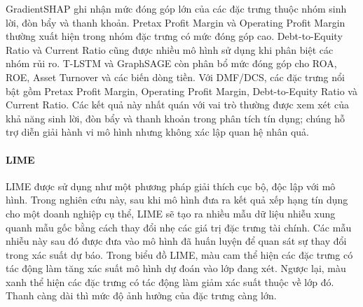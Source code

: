 \documentclass[10pt,twoside]{article}
\begin{document}
GradientSHAP ghi nhận mức đóng góp lớn của các đặc trưng thuộc nhóm sinh lời, đòn bẩy và thanh khoản. Pretax Profit Margin và Operating Profit Margin thường xuất hiện trong nhóm đặc trưng có mức đóng góp cao. Debt-to-Equity Ratio và Current Ratio cũng được nhiều mô hình sử dụng khi phân biệt các nhóm rủi ro. T-LSTM và GraphSAGE còn phân bổ mức đóng góp cho ROA, ROE, Asset Turnover và các biến dòng tiền. Với DMF/DCS, các đặc trưng nổi bật gồm Pretax Profit Margin, Operating Profit Margin, Debt-to-Equity Ratio và Current Ratio. Các kết quả này nhất quán với vai trò thường được xem xét của khả năng sinh lời, đòn bẩy và thanh khoản trong phân tích tín dụng; chúng hỗ trợ diễn giải hành vi mô hình nhưng không xác lập quan hệ nhân quả.

\paragraph{LIME}
LIME được sử dụng như một phương pháp giải thích cục bộ, độc lập với mô hình. Trong nghiên cứu này, sau khi mô hình đưa ra kết quả xếp hạng tín dụng cho một doanh nghiệp cụ thể, LIME sẽ tạo ra nhiều mẫu dữ liệu nhiễu xung quanh mẫu gốc bằng cách thay đổi nhẹ các giá trị đặc trưng tài chính. Các mẫu nhiễu này sau đó được đưa vào mô hình đã huấn luyện để quan sát sự thay đổi trong xác suất dự báo. Trong biểu đồ LIME, màu cam thể hiện các đặc trưng có tác động làm tăng xác suất mô hình dự đoán vào lớp đang xét. Ngược lại, màu xanh thể hiện các đặc trưng có tác động làm giảm xác suất thuộc về lớp đó. Thanh càng dài thì mức độ ảnh hưởng của đặc trưng càng lớn.
\end{document}
